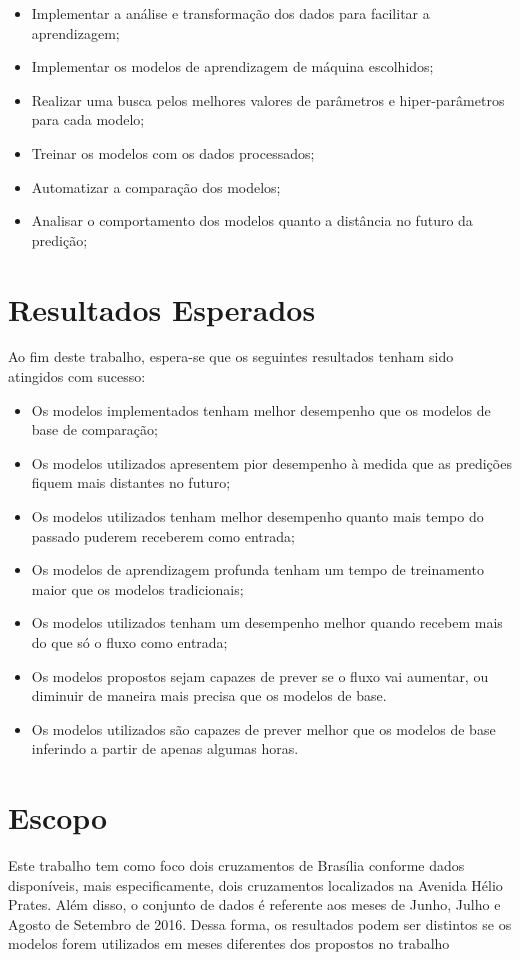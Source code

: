\begin{itemize}
    \item Implementar a análise e transformação dos dados para facilitar a aprendizagem;
    \item Implementar os modelos de aprendizagem de máquina escolhidos; 
    \item Realizar uma busca pelos melhores valores de parâmetros e hiper-parâmetros para cada modelo;
    \item Treinar os modelos com os dados processados;
    \item Automatizar a comparação dos modelos;
    \item Analisar o comportamento dos modelos quanto a distância no futuro da predição;
\end{itemize}

\section{Resultados Esperados} 

Ao fim deste trabalho, espera-se que os seguintes resultados tenham sido atingidos com sucesso:

\begin{itemize}
    \item  Os modelos implementados tenham melhor desempenho que os modelos de base de comparação;
    \item Os modelos utilizados apresentem pior desempenho à medida que as predições fiquem mais distantes no futuro;
    \item Os modelos utilizados tenham melhor desempenho quanto mais tempo do passado puderem receberem como entrada;
    \item Os modelos de aprendizagem profunda tenham um tempo de treinamento maior que os modelos tradicionais;
    \item Os modelos utilizados tenham um desempenho melhor quando recebem mais do que só o fluxo como entrada;
    \item Os modelos propostos sejam capazes de prever se o fluxo vai aumentar, ou diminuir de maneira mais precisa que os modelos de base.
    \item Os modelos utilizados são capazes de prever melhor que os modelos de base inferindo a partir de apenas algumas horas.
\end{itemize}

\section{Escopo}
Este trabalho tem como foco dois cruzamentos de Brasília conforme dados disponíveis, mais especificamente, dois cruzamentos localizados na Avenida Hélio Prates. Além disso, o conjunto de dados é referente aos meses de Junho, Julho e Agosto de Setembro de 2016. Dessa forma, os resultados podem ser distintos se os modelos forem utilizados em meses diferentes dos propostos no trabalho

